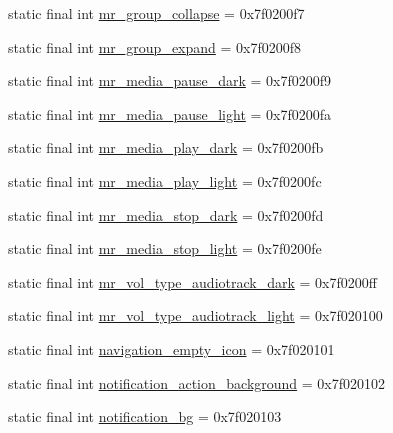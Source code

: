 \begin{CompactItemize}
\item 
static final int \hyperlink{classandroid_1_1support_1_1v7_1_1palette_1_1_r_1_1drawable_cecf408aa23dbe15e46fbfc2e6729913}{mr\_\-group\_\-collapse} = 0x7f0200f7
\item 
static final int \hyperlink{classandroid_1_1support_1_1v7_1_1palette_1_1_r_1_1drawable_c267d185c3f03bb6a1b9def1c790c264}{mr\_\-group\_\-expand} = 0x7f0200f8
\item 
static final int \hyperlink{classandroid_1_1support_1_1v7_1_1palette_1_1_r_1_1drawable_b3c1f2a782ef2e7d6cf7ee95215bcc8a}{mr\_\-media\_\-pause\_\-dark} = 0x7f0200f9
\item 
static final int \hyperlink{classandroid_1_1support_1_1v7_1_1palette_1_1_r_1_1drawable_179e7e804782cc0c6e42c730f4e760c6}{mr\_\-media\_\-pause\_\-light} = 0x7f0200fa
\item 
static final int \hyperlink{classandroid_1_1support_1_1v7_1_1palette_1_1_r_1_1drawable_6b50552b8b6196acb5d7d9698cf1c5d3}{mr\_\-media\_\-play\_\-dark} = 0x7f0200fb
\item 
static final int \hyperlink{classandroid_1_1support_1_1v7_1_1palette_1_1_r_1_1drawable_eb5077216a16a9ad76af55ed2f72ecd0}{mr\_\-media\_\-play\_\-light} = 0x7f0200fc
\item 
static final int \hyperlink{classandroid_1_1support_1_1v7_1_1palette_1_1_r_1_1drawable_117efb0c0cde1f1c786e4048eb4bcfb6}{mr\_\-media\_\-stop\_\-dark} = 0x7f0200fd
\item 
static final int \hyperlink{classandroid_1_1support_1_1v7_1_1palette_1_1_r_1_1drawable_26ff5acc638aee6f94244722e420741f}{mr\_\-media\_\-stop\_\-light} = 0x7f0200fe
\item 
static final int \hyperlink{classandroid_1_1support_1_1v7_1_1palette_1_1_r_1_1drawable_9a7e6b9862e0ac87d7d5a0fc71523206}{mr\_\-vol\_\-type\_\-audiotrack\_\-dark} = 0x7f0200ff
\item 
static final int \hyperlink{classandroid_1_1support_1_1v7_1_1palette_1_1_r_1_1drawable_bee1a5ed4255dfaa099ebefa19506a8c}{mr\_\-vol\_\-type\_\-audiotrack\_\-light} = 0x7f020100
\item 
static final int \hyperlink{classandroid_1_1support_1_1v7_1_1palette_1_1_r_1_1drawable_5591a5ec12f40676bcad4e1ece94773a}{navigation\_\-empty\_\-icon} = 0x7f020101
\item 
static final int \hyperlink{classandroid_1_1support_1_1v7_1_1palette_1_1_r_1_1drawable_064fe8c4b353645fd406ef3a29e3aa2a}{notification\_\-action\_\-background} = 0x7f020102
\item 
static final int \hyperlink{classandroid_1_1support_1_1v7_1_1palette_1_1_r_1_1drawable_02c0311221724175622985721af91855}{notification\_\-bg} = 0x7f020103

\end{CompactItemize}
